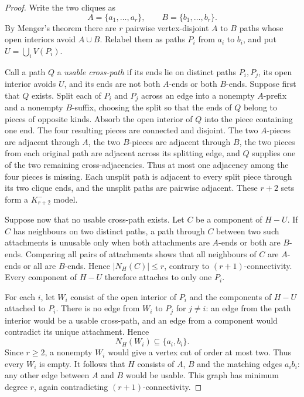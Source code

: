 \documentclass[11pt]{amsart}
\newcommand{\N}{N}
\begin{document}
\begin{proof}
Write the two cliques as
\[
        A=\{a_1,\ldots,a_r\},
        \qquad B=\{b_1,\ldots,b_r\}.
\]
By Menger's theorem there are $r$ pairwise vertex-disjoint $A$ to $B$
paths whose open interiors avoid $A\cup B$.  Relabel them as paths $P_i$
from $a_i$ to $b_i$, and put $U=\bigcup_iV(P_i)$.

Call a path $Q$ a \emph{usable cross-path} if its ends lie on distinct
paths $P_i,P_j$, its open interior avoids $U$, and its ends are not both
$A$-ends or both $B$-ends.  Suppose first that $Q$ exists.  Split each of
$P_i$ and $P_j$ across an edge into a nonempty $A$-prefix and a nonempty
$B$-suffix, choosing the split so that the ends of $Q$ belong to pieces of
opposite kinds.  Absorb the open interior of $Q$ into the piece containing
one end.  The four resulting pieces are connected and disjoint.  The two
$A$-pieces are adjacent through $A$, the two $B$-pieces are adjacent
through $B$, the two pieces from each original path are adjacent across
its splitting edge, and $Q$ supplies one of the two remaining
cross-adjacencies.  Thus at most one adjacency among the four pieces is
missing.  Each unsplit path is adjacent to every split piece through its
two clique ends, and the unsplit paths are pairwise adjacent.  These
$r+2$ sets form a $K_{r+2}^{-}$ model.

Suppose now that no usable cross-path exists.  Let $C$ be a component of
$H-U$.  If $C$ has neighbours on two distinct paths, a path through $C$
between two such attachments is unusable only when both attachments are
$A$-ends or both are $B$-ends.  Comparing all pairs of attachments shows
that all neighbours of $C$ are $A$-ends or all are $B$-ends.  Hence
$|\N_H(C)|\leq r$, contrary to $(r+1)$-connectivity.  Every component of
$H-U$ therefore attaches to only one $P_i$.

For each $i$, let $W_i$ consist of the open interior of $P_i$ and the
components of $H-U$ attached to $P_i$.  There is no edge from $W_i$ to
$P_j$ for $j\ne i$: an edge from the path interior would be a usable
cross-path, and an edge from a component would contradict its unique
attachment.  Hence
\[
        \N_H(W_i)\subseteq\{a_i,b_i\}.
\]
Since $r\geq2$, a nonempty $W_i$ would give a vertex cut of order at most
two.  Thus every $W_i$ is empty.  It follows that $H$ consists of $A$, $B$
and the matching edges $a_ib_i$: any other edge between $A$ and $B$ would
be usable.  This graph has minimum degree $r$, again contradicting
$(r+1)$-connectivity.
\end{proof}
\end{document}
